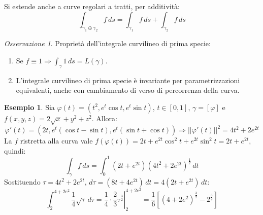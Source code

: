 \documentclass[11pt, a4paper, openright]{book}
\theoremstyle{plain}
\theoremstyle{definition}
\newtheorem{esempio}[teorema]{Esempio}
\theoremstyle{remark}
\newtheorem{osservazione}[teorema]{Osservazione}
\begin{document}
Si estende anche a curve regolari a tratti, per additività:
\begin{equation}
    \int_{\gamma_1 \oplus \gamma_2} f \, ds = \int_{\gamma_1} f \, ds + \int_{\gamma_2} f \, ds
\end{equation}

\begin{osservazione}
    Proprietà dell'integrale curvilineo di prima specie:
    \begin{enumerate}
        \item Se $f \equiv 1 \Longrightarrow \int_\gamma 1 \, ds = L(\gamma)$.
        \item L'integrale curvilineo di prima specie è invariante per parametrizzazioni equivalenti, anche con cambiamento di verso di percorrenza della curva.
    \end{enumerate}
\end{osservazione}

\begin{esempio}
    Sia $\varphi(t) = (t^2, e^t\cos t, e^t\sin t)$, $t \in [0, 1]$, $\gamma = [\varphi]$ e $f(x, y, z) = 2\sqrt{x} + y^2 + z^2$. Allora:
    \begin{equation}
        \varphi'(t) = \left(2t, e^t(\cos t - \sin t), e^t(\sin t + \cos t)\right) \Longrightarrow ||\varphi'(t)||^2 = 4t^2 + 2e^{2t}
    \end{equation}
    La $f$ ristretta alla curva vale $f(\varphi(t)) = 2t + e^{2t}\cos^2 t + e^{2t}\sin^2 t = 2t + e^{2t}$, quindi:
    \begin{equation}
        \int_\gamma f \, ds = \int_{0}^{1} (2t + e^{2t})(4t^2 + 2e^{2t})^{\frac{1}{2}} \, dt
    \end{equation}
    Sostituendo $\tau = 4t^2 + 2e^{2t}$, $d\tau = (8t + 4e^{2t}) \, dt = 4(2t + e^{2t}) \, dt$:
    \begin{equation}
        \int_{2}^{4 + 2e^2} \frac{1}{4}\sqrt{\tau} \, d\tau = \left.\frac{1}{4} \cdot \frac{2}{3}\tau^{\frac{3}{2}}\right|_2^{4 + 2e^2} = \frac{1}{6}\left[(4 + 2e^2)^{\frac{3}{2}} - 2^{\frac{3}{2}}\right]
    \end{equation}
\end{esempio}
\end{document}
